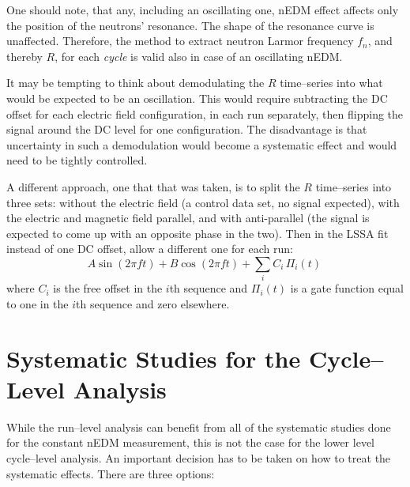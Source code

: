One should note, that any, including an oscillating one, nEDM effect affects only the position of the neutrons' resonance. The shape of the resonance curve is unaffected. Therefore, the method to extract neutron Larmor frequency $f_n$, and thereby $R$, for each \emph{cycle} is valid also in case of an oscillating nEDM.

It may be tempting to think about demodulating the $R$ time--series into what would be expected to be an oscillation. This would require subtracting the DC offset for each electric field configuration, in each run separately, then flipping the signal around the DC level for one configuration.  The disadvantage is that uncertainty in such a demodulation would become a systematic effect and would need to be tightly controlled.

A different approach, one that that was taken, is to split the $R$ time--series into three sets: without the electric field (a control data set, no signal expected), with the electric and magnetic field parallel, and with anti-parallel (the signal is expected to come up with an opposite phase in the two). Then in the LSSA fit instead of one DC offset, allow a different one for each run:
\begin{equation}
  A\sin(2 \pi f t) + B\cos(2 \pi f t) + \sum_i C_i\,\Pi_i(t) \,
\end{equation}
where $C_i$ is the free offset in the $i$th sequence and $\Pi_i(t)$ is a gate function equal to one in the $i$th sequence and zero elsewhere.






\section{Systematic Studies for the Cycle--Level Analysis}
While the run--level analysis can benefit from all of the systematic studies done for the constant nEDM measurement, this is not the case for the lower level cycle--level analysis. An important decision has to be taken on how to treat the systematic effects. There are three options:

